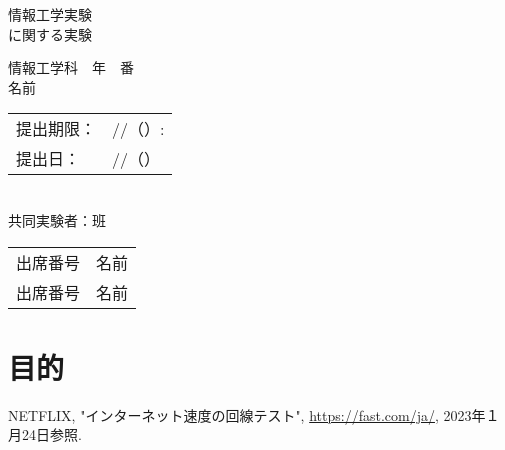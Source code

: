 \documentclass[titlepage]{ltjsreport}
\begin{document}
\makeatletter
\let\c@lstlisting=\c@figure
\makeatother
\begin{titlepage}
\vspace*{1em}
\begin{center}
\begin{huge}
情報工学実験
\\
\vspace{1em}
に関する実験
\end{huge}
\end{center}
\vspace{6em}
\begin{flushright}
\begin{LARGE}
情報工学科　年　番
\\
\vspace{1em}
名前
\end{LARGE}
\end{flushright}
\vspace{4em}
\begin{flushleft}
\begin{Large}
\begin{tabular}{ll}
提出期限： & //（）:
\\
提出日： & //（）
\\
\end{tabular}
\\
\vspace{2em}
共同実験者：班
\\
\vspace{1em}
\begin{tabular}{ll}
出席番号 & 名前
\\
出席番号 & 名前
\\
\end{tabular}
\end{Large}
\end{flushleft}
\end{titlepage}
\begin{abstract}
\end{abstract}
\chapter{目的}
\begin{thebibliography}{99}
 NETFLIX, "インターネット速度の回線テスト", \url{https://fast.com/ja/}, 2023年１月24日参照.
\end{thebibliography}
\end{document}
